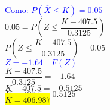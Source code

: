\documentclass[DIV=calc,paper=a4,fontsize=11pt,openany]{book}
\begin{document}
\textcolor{blue}{Como: $\textit{P}(\overline{X} \leqslant \textit{K}) = 0.05$}\\

$0.05 = \textit{P}(Z \leqslant \dfrac{K - 407.5}{0.3125})$\\

$\textit{P}(Z \leqslant \dfrac{K - 407.5}{0.3125}) = 0.05$\\

\textcolor{blue}{$\textit{Z} = -1.64 \quad F(\textit{Z})$}\\

$ \dfrac{K - 407.5}{0.3125} = -1.64$\\

$ K - 407.5 = -0.5125$\\

$ K  = 407.5 -0.5125$\\

\colorbox{yellow}{$K = 406.987$}
\end{document}
